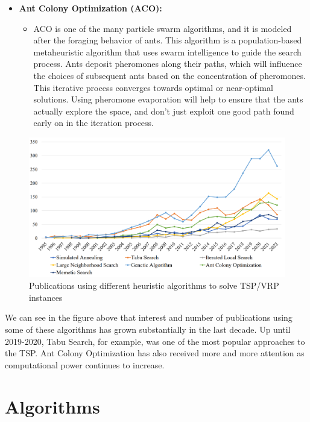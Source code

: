 \documentclass{article}
\begin{document}
\begin{itemize}
    \item \textbf{Ant Colony Optimization (ACO):}   
    \begin{itemize}
        \item ACO is one of the many particle swarm algorithms, and it is modeled after the foraging behavior of ants. This algorithm is a population-based metaheuristic algorithm that uses swarm intelligence to guide the search process. Ants deposit pheromones along their paths, which will influence the choices of subsequent ants based on the concentration of pheromones. This iterative process converges towards optimal or near-optimal solutions. Using pheromone evaporation will help to ensure that the ants actually explore the space, and don't just exploit one good path found early on in the iteration process.
    \end{itemize}
\end{itemize}

\begin{figure}[h]
    \centering
    \includegraphics[width=\textwidth,keepaspectratio]{Images/TSPAlgs.PNG}
    \caption{Publications using different heuristic algorithms to solve TSP/VRP instances}
    \label{fig:algsOverTime}
\end{figure}

\noindent We can see in the figure above that interest and number of publications using some of these algorithms has grown substantially in the last decade. Up until 2019-2020, Tabu Search, for example, was one of the most popular approaches to the TSP. Ant Colony Optimization has also received more and more attention as computational power continues to increase. 


\section{Algorithms}
\end{document}
